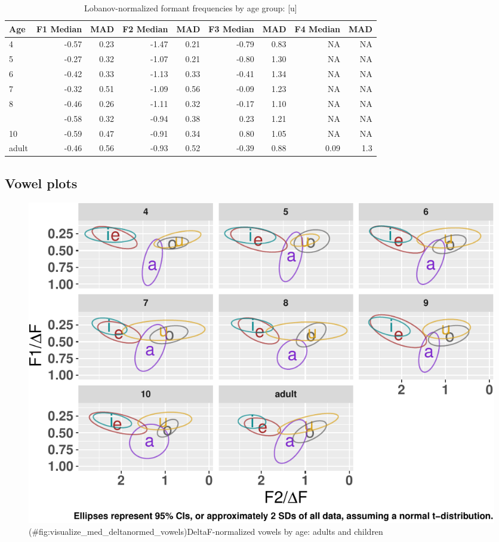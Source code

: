 \documentclass[
]{article}
\begin{document}
\begin{table}[!h]

\caption{\label{tab:lobanov-meas-tbl-u}Lobanov-normalized formant frequencies by age group: [u]}
\centering
\begin{tabular}[t]{lrrrrrrrr}
\toprule
Age & F1 Median & MAD & F2 Median & MAD & F3 Median & MAD & F4 Median & MAD\\
\midrule
4 & -0.57 & 0.23 & -1.47 & 0.21 & -0.79 & 0.83 & NA & NA\\
5 & -0.27 & 0.32 & -1.07 & 0.21 & -0.80 & 1.30 & NA & NA\\
6 & -0.42 & 0.33 & -1.13 & 0.33 & -0.41 & 1.34 & NA & NA\\
7 & -0.32 & 0.51 & -1.09 & 0.56 & -0.09 & 1.23 & NA & NA\\
8 & -0.46 & 0.26 & -1.11 & 0.32 & -0.17 & 1.10 & NA & NA\\
\addlinespace
9 & -0.58 & 0.32 & -0.94 & 0.38 & 0.23 & 1.21 & NA & NA\\
10 & -0.59 & 0.47 & -0.91 & 0.34 & 0.80 & 1.05 & NA & NA\\
adult & -0.46 & 0.56 & -0.93 & 0.52 & -0.39 & 0.88 & 0.09 & 1.3\\
\bottomrule
\end{tabular}
\end{table}

\hypertarget{vowel-plots}{%
\subsection{Vowel plots}\label{vowel-plots}}

\begin{figure}
\centering
\includegraphics{3_vtl_results_files/figure-latex/visualize_med_deltanormed_vowels-1.pdf}
\caption{(\#fig:visualize\_med\_deltanormed\_vowels)DeltaF-normalized vowels by age: adults and children}
\end{figure}
\end{document}
